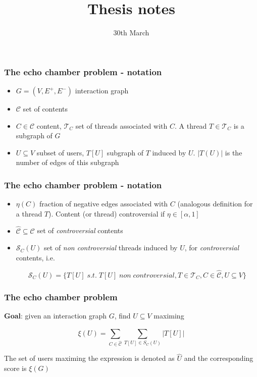 \documentclass{beamer}
\title{Thesis notes}
\date{30th March}
\begin{document}
\frame{\titlepage}

\begin{frame}[c]
	\frametitle{The echo chamber problem - notation}
	\begin{itemize}
		\item $G = (V, E ^{+}, E ^{-}) $ interaction graph
		\item $ \mathcal{C} $ set of contents
		\item $C \in \mathcal{C} $ content, $\mathcal{T} _{C} $ set of threads
		      associated with $C$. A thread $T \in \mathcal{T} _{C} $ is a
		      subgraph of $G$
		\item $U \subseteq V$ subset of users, $T[U]$ subgraph of $T$ induced
		      by $U$. $|T(U)|$ is the number of edges of this subgraph
	\end{itemize}
\end{frame}

\begin{frame}[c]
	\frametitle{The echo chamber problem - notation}
	\begin{itemize}
		\item $\eta(C)$ fraction of negative edges associated with $C$
		      (analogous definition for a thread $T$). Content (or thread)
		      controversial if $\eta \in [\alpha, 1]$
		\item $\hat{\mathcal{C} } \subseteq \mathcal{C} $ set of \textit{controversial}
		      contents

		\item $\mathcal{S} _C (U)$ set of \textit{non controversial} threads
		      induced by $U$, for \textit{controversial} contents, i.e.

			      {\small
				      \begin{equation}
					      \mathcal{S} _{C} (U) = \{ T[U] \; s.t. \; T[U] \; non \;
					      controversial, T \in \mathcal{T} _{C}, C
					      \in \hat{\mathcal{C}}, U \subseteq V\}
				      \end{equation}
			      }
	\end{itemize}

\end{frame}

\begin{frame}[c]
	\frametitle{The echo chamber problem}
	\textbf{Goal}: given an interaction graph $G$, find $U \subseteq V$ maximing

	\begin{equation}
		\xi (U) = \sum^{}_{C \in \hat{\mathcal{C}} } \sum^{}_{T[U] \in S_C (U)}
		| T[U] |
	\end{equation}

	The set of users maximing the expression is denoted as $\hat{U}$ and the
	corresponding score is $\xi(G)$
\end{frame}
\end{document}
